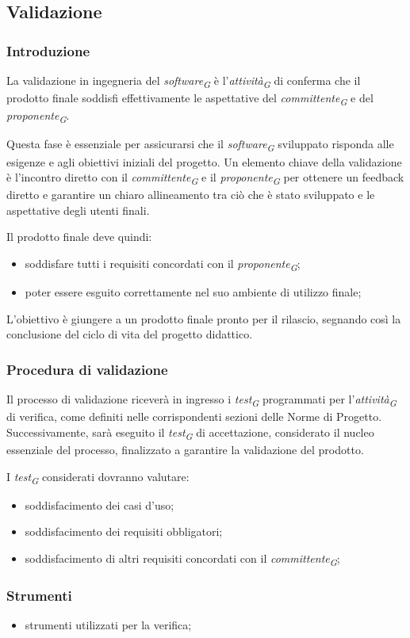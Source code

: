 \subsection{Validazione}

\subsubsection{Introduzione}
La validazione in ingegneria del \textit{software}\textsubscript{\textit{G}} è l'\textit{attività}\textsubscript{\textit{G}} di conferma che il prodotto finale soddisfi effettivamente le aspettative del \textit{committente}\textsubscript{\textit{G}} e del \textit{proponente}\textsubscript{\textit{G}}. 

Questa fase è essenziale per assicurarsi che il \textit{software}\textsubscript{\textit{G}} sviluppato risponda alle esigenze e agli obiettivi iniziali del progetto. 
Un elemento chiave della validazione è l'incontro diretto con il \textit{committente}\textsubscript{\textit{G}} e il \textit{proponente}\textsubscript{\textit{G}} per ottenere un feedback diretto e garantire un chiaro allineamento tra ciò che è stato sviluppato e le aspettative degli utenti finali. 

Il prodotto finale deve quindi: 
\begin{itemize}
    \item 
        soddisfare tutti i requisiti concordati con il \textit{proponente}\textsubscript{\textit{G}}; 
    \item 
        poter essere esguito correttamente nel suo ambiente di utilizzo finale; 
\end{itemize}

L'obiettivo è giungere a un prodotto finale pronto per il rilascio, segnando così la conclusione del ciclo di vita del progetto didattico. 

\subsubsection{Procedura di validazione}
Il processo di validazione riceverà in ingresso i \textit{test}\textsubscript{\textit{G}} programmati per l'\textit{attività}\textsubscript{\textit{G}} di verifica, come definiti nelle corrispondenti sezioni delle Norme di Progetto. Successivamente, sarà eseguito il \textit{test}\textsubscript{\textit{G}} di accettazione, considerato il nucleo essenziale del processo, finalizzato a garantire la validazione del prodotto. 

I \textit{test}\textsubscript{\textit{G}} considerati dovranno valutare: 
\begin{itemize}
    \item  
        soddisfacimento dei casi d’uso;
    \item 
        soddisfacimento dei requisiti obbligatori;
    \item 
        soddisfacimento di altri requisiti concordati con il \textit{committente}\textsubscript{\textit{G}}; 
\end{itemize}

\subsubsection{Strumenti}
\begin{itemize}
    \item 
        strumenti utilizzati per la verifica; 
\end{itemize}
